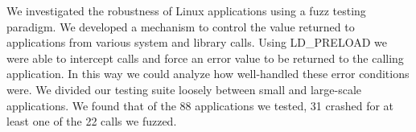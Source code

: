 We investigated the robustness of Linux applications using a fuzz testing paradigm. We developed a mechanism to control the value returned to applications from various system and library calls. Using LD\_PRELOAD we were able to intercept calls and force an error value to be returned to the calling application. In this way we could analyze how well-handled these error conditions were. We divided our testing suite loosely between small and large-scale applications. We found that of the 88 applications we tested, 31 crashed for at least one of the 22 calls we fuzzed.